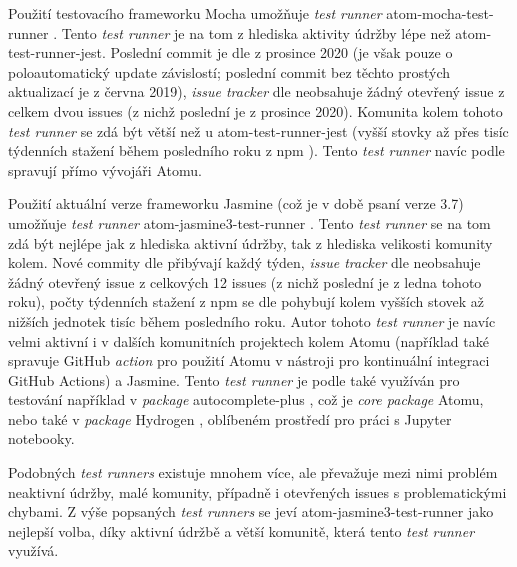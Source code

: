 Použití testovacího frameworku Mocha umožňuje \textit{test runner} atom-mocha-test-runner
\cite{test-runner-mocha-github}. Tento \textit{test runner} je na tom z hlediska aktivity údržby lépe než
atom-test-runner-jest. Poslední commit je dle \cite{test-runner-mocha-github} z prosince 2020 (je však pouze o
poloautomatický update závislostí; poslední commit bez těchto prostých aktualizací je z června 2019), \textit
{issue tracker} dle \cite{test-runner-mocha-github} neobsahuje žádný otevřený issue z celkem dvou issues (z nichž
poslední je z prosince 2020). Komunita kolem tohoto \textit{test runner} se zdá být větší než u atom-test-runner-jest
(vyšší stovky až přes tisíc týdenních stažení během posledního roku z npm \cite{npm}). Tento \textit{test runner} navíc
podle \cite{test-runner-mocha-github} spravují přímo vývojáři Atomu.

Použití aktuální verze frameworku Jasmine (což je v době psaní verze 3.7) umožňuje \textit{test runner}
atom-jasmine3-test-runner \cite{test-runner-jasmine3-github}. Tento \textit{test runner} se na tom zdá být nejlépe jak z
hlediska aktivní údržby, tak z hlediska velikosti komunity kolem. Nové commity dle \cite{test-runner-jasmine3-github}
přibývají každý týden, \textit{issue tracker} dle \cite{test-runner-jasmine3-github} neobsahuje žádný otevřený issue z
celkových 12 issues (z nichž poslední je z ledna tohoto roku), počty týdenních stažení z npm se dle \cite{npm} pohybují
kolem vyšších stovek až nižších jednotek tisíc během posledního roku. Autor tohoto \textit{test runner} je navíc velmi
aktivní i v dalších komunitních projektech kolem Atomu (například také spravuje \cite{github-action-setup-atom} GitHub
\textit{action} pro použití Atomu v nástroji pro kontinuální integraci GitHub Actions) a Jasmine. Tento
\textit{test runner} je podle \cite{test-runner-jasmine3-github} také využíván pro testování například v
\textit{package} autocomplete-plus \cite{atom-package-autocomplete-plus}, což je \textit{core package} Atomu, nebo také
v \textit{package} Hydrogen \cite{atom-package-hydrogen}, oblíbeném prostředí pro práci s Jupyter notebooky.

Podobných \textit{test runners} existuje mnohem více, ale převažuje mezi nimi problém neaktivní údržby, malé komunity,
případně i otevřených issues s problematickými chybami. Z výše popsaných \textit{test runners} se jeví
atom-jasmine3-test-runner jako nejlepší volba, díky aktivní údržbě a větší komunitě, která tento \textit{test runner}
využívá.
